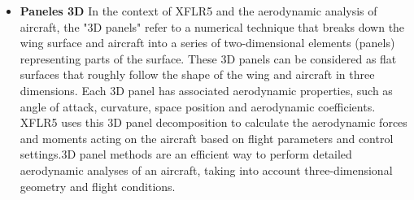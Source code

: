 \begin{itemize}
\item  \textbf{Paneles 3D} In the context of XFLR5 and the aerodynamic analysis of aircraft, the "3D panels" refer to a numerical technique that breaks down the wing surface and aircraft into a series of two-dimensional elements (panels) representing parts of the surface. These 3D panels can be considered as flat surfaces that roughly follow the shape of the wing and aircraft in three dimensions. Each 3D panel has associated aerodynamic properties, such as angle of attack, curvature, space position and aerodynamic coefficients. XFLR5 uses this 3D panel decomposition to calculate the aerodynamic forces and moments acting on the aircraft based on flight parameters and control settings.3D panel methods are an efficient way to perform detailed aerodynamic analyses of an aircraft, taking into account three-dimensional geometry and flight conditions.
\end{itemize}

